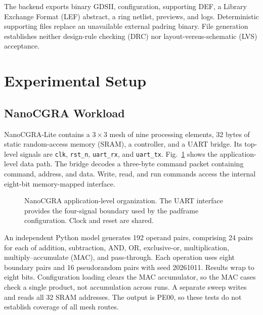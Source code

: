 \documentclass[conference,letterpaper]{IEEEtran}
\begin{document}
The backend exports binary GDSII, configuration, supporting DEF, a Library Exchange Format (LEF) abstract, a ring netlist, previews, and logs. Deterministic supporting files replace an unavailable external padring binary. File generation establishes neither design-rule checking (DRC) nor layout-versus-schematic (LVS) acceptance.

\section{Experimental Setup}
\subsection{NanoCGRA Workload}
NanoCGRA-Lite contains a $3\times3$ mesh of nine processing elements, 32 bytes of static random-access memory (SRAM), a controller, and a UART bridge. Its top-level signals are \texttt{clk}, \texttt{rst\_n}, \texttt{uart\_rx}, and \texttt{uart\_tx}. Fig.~\ref{fig:nano} shows the application-level data path. The bridge decodes a three-byte command packet containing command, address, and data. Write, read, and run commands access the internal eight-bit memory-mapped interface.

\begin{figure}[t]
\centering
{}
\caption{NanoCGRA application-level organization. The UART interface provides the four-signal boundary used by the padframe configuration. Clock and reset are shared.}
\label{fig:nano}
\end{figure}

An independent Python model generates 192 operand pairs, comprising 24 pairs for each of addition, subtraction, AND, OR, exclusive-or, multiplication, multiply--accumulate (MAC), and pass-through. Each operation uses eight boundary pairs and 16 pseudorandom pairs with seed 20261011. Results wrap to eight bits. Configuration loading clears the MAC accumulator, so the MAC cases check a single product, not accumulation across runs. A separate sweep writes and reads all 32 SRAM addresses. The output is PE00, so these tests do not establish coverage of all mesh routes.
\end{document}
